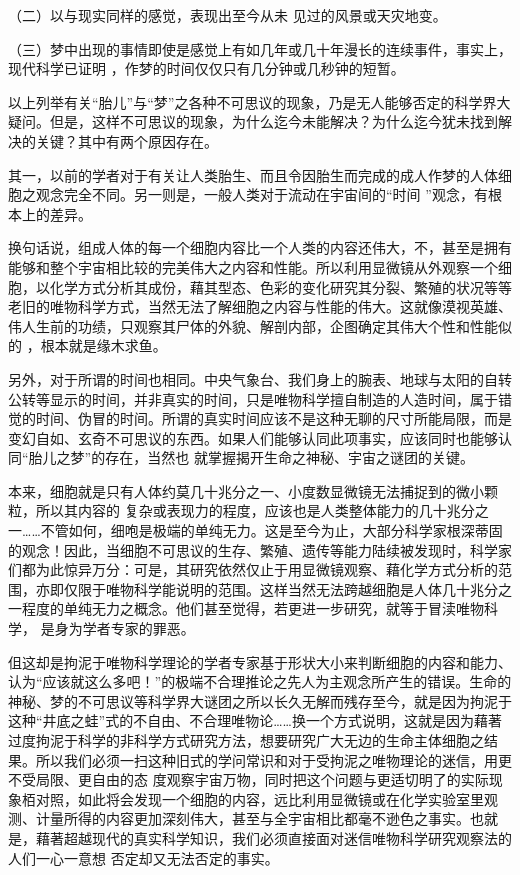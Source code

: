\documentclass{article}
\begin{document}
（二）以与现实同样的感觉，表现出至今从未
见过的风景或天灾地变。 

（三）梦中出现的事情即使是感觉上有如几年或几十年漫长的连续事件，事实上，现代科学已证明
，作梦的时间仅仅只有几分钟或几秒钟的短暂。 

以上列举有关“胎儿”与“梦”之各种不可思议的现象，乃是无人能够否定的科学界大疑问。但是，这样不可思议的现象，为什么迄今未能解决？为什么迄今犹未找到解决的关键？其中有两个原因存在。

其一，以前的学者对于有关让人类胎生、而且令因胎生而完成的成人作梦的人体细胞之观念完全不同。另一则是，一般人类对于流动在宇宙间的“时间
”观念，有根本上的差异。 

\newpage

换句话说，组成人体的每一个细胞内容比一个人类的内容还伟大，不，甚至是拥有能够和整个宇宙相比较的完美伟大之内容和性能。所以利用显微镜从外观察一个细胞，以化学方式分析其成份，藉其型态、色彩的变化研究其分裂、繁殖的状况等等老旧的唯物科学方式，当然无法了解细胞之内容与性能的伟大。这就像漠视英雄、伟人生前的功绩，只观察其尸体的外貌、解剖内部，企图确定其伟大个性和性能似的
，根本就是缘木求鱼。 

另外，对于所谓的时间也相同。中央气象台、我们身上的腕表、地球与太阳的自转公转等显示的时间，并非真实的时间，只是唯物科学擅自制造的人造时间，属于错觉的时间、伪冒的时间。所谓的真实时间应该不是这种无聊的尺寸所能局限，而是变幻自如、玄奇不可思议的东西。如果人们能够认同此项事实，应该同时也能够认同“胎儿之梦”的存在，当然也
就掌握揭开生命之神秘、宇宙之谜团的关键。 

本来，细胞就是只有人体约莫几十兆分之一、小度数显微镜无法捕捉到的微小颗粒，所以其内容的
\newpage
复杂或表现力的程度，应该也是人类整体能力的几十兆分之一……不管如何，细咆是极端的单纯无力。这是至今为止，大部分科学家根深蒂固的观念！因此，当细胞不可思议的生存、繁殖、遗传等能力陆续被发现时，科学家们都为此惊异万分：可是，其研究依然仅止于用显微镜观察、藉化学方式分析的范围，亦即仅限于唯物科学能说明的范围。这样当然无法跨越细胞是人体几十兆分之一程度的单纯无力之概念。他们甚至觉得，若更进一步研究，就等于冒渎唯物科学，
是身为学者专家的罪恶。 

伹这却是拘泥于唯物科学理论的学者专家基于形状大小来判断细胞的内容和能力、认为“应该就这么多吧！”的极端不合理推论之先人为主观念所产生的错误。生命的神秘、梦的不可思议等科学界大谜团之所以长久无解而残存至今，就是因为拘泥于这种“井底之蛙”式的不自由、不合理唯物论……换一个方式说明，这就是因为藉著过度拘泥于科学的非科学方式研究方法，想要研究广大无边的生命主体细胞之结果。所以我们必须一扫这种旧式的学问常识和对于受拘泥之唯物理论的迷信，用更不受局限、更自由的态
\newpage
度观察宇宙万物，同时把这个问题与更适切明了的实际现象栢对照，如此将会发现一个细胞的内容，远比利用显微镜或在化学实验室里观测、计量所得的内容更加深刻伟大，甚至与全宇宙相比都毫不逊色之事实。也就是，藉著超越现代的真实科学知识，我们必须直接面对迷信唯物科学研究观察法的人们一心一意想
否定却又无法否定的事实。 
\end{document}

